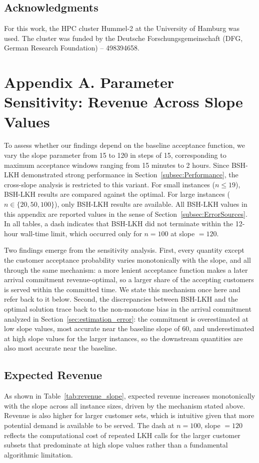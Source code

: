 \documentclass[11pt]{article}
\theoremstyle{plain}
\theoremstyle{definition}
\newcommand{\ACKNOWLEDGMENT}[1]{\subsection*{Acknowledgments}\noindent #1}
\begin{document}

	\ACKNOWLEDGMENT{For this work, the HPC cluster Hummel-2 at the University of Hamburg was used. The cluster was funded by the Deutsche Forschungsgemeinschaft (DFG, German Research Foundation) -- 498394658.}

		

	\clearpage
	\section*{Appendix A. Parameter Sensitivity: Revenue Across Slope Values}
\setcounter{subsection}{0}
\renewcommand{\thesubsection}{A.\arabic{subsection}}
To assess whether our findings depend on the baseline acceptance function, we vary the slope parameter from 15 to 120 in steps of 15, corresponding to maximum
acceptance windows ranging from 15 minutes to 2 hours. Since BSH-\ac{LKH} demonstrated
strong performance in Section~\ref{subsec:Performance}, the cross-slope analysis is
restricted to this variant. For small instances ($n \leq 19$), BSH-\ac{LKH} results are
compared against the optimal. For large instances ($n \in \{20, 50, 100\}$), only BSH-\ac{LKH}
results are available. All BSH-\ac{LKH} values in this appendix are reported values in
the sense of Section~\ref{subsec:ErrorSources}. In all tables, a dash indicates that
BSH-\ac{LKH} did not terminate within the 12-hour wall-time limit, which occurred only for
$n = 100$ at slope $= 120$.

Two findings emerge from the sensitivity analysis. First, every quantity except the
customer acceptance probability varies monotonically with the slope, and all through the
same mechanism: a more lenient acceptance function makes a later arrival commitment
revenue-optimal, so a larger share of the accepting customers is served within the
committed time. We state this mechanism once here and refer back to it below. Second, the
discrepancies between BSH-\ac{LKH} and the optimal solution trace back to the non-monotone
bias in the arrival commitment analyzed in Section~\ref{sec:estimation_error}: the
commitment is overestimated at low slope values, most accurate near the baseline slope of
60, and underestimated at high slope values for the larger instances, so the downstream
quantities are also most accurate near the baseline.

\subsection{Expected Revenue}
As shown in Table~\ref{tab:revenue_slope}, expected revenue increases
monotonically with the slope across all instance sizes, driven by the mechanism stated
above. Revenue is also higher for larger customer sets, which is intuitive given that
more potential demand is available to be served. The dash at $n = 100$, slope $= 120$
reflects the computational cost of repeated \ac{LKH} calls for the larger customer
subsets that predominate at high slope values rather than a fundamental algorithmic
limitation.
\end{document}
